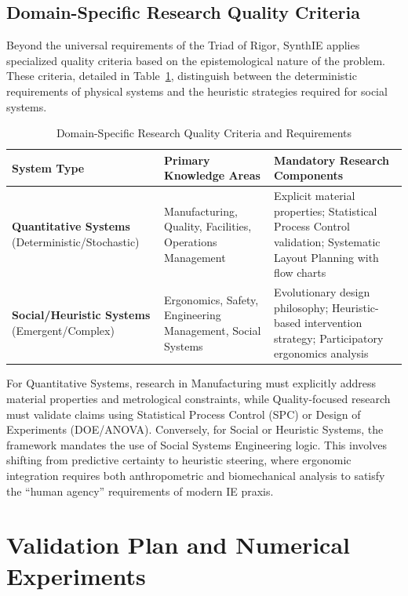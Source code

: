\documentclass[12pt,a4paper]{article}
\begin{document}
\subsection{Domain-Specific Research Quality Criteria}

Beyond the universal requirements of the Triad of Rigor, SynthIE applies specialized quality criteria based on the epistemological nature of the problem. These criteria, detailed in Table~\ref{tab:domain_criteria}, distinguish between the deterministic requirements of physical systems and the heuristic strategies required for social systems.

\begin{table}[h]
\centering
\caption{Domain-Specific Research Quality Criteria and Requirements}
\label{tab:domain_criteria}
\small
\begin{tabular}{@{}p{4cm}p{5cm}p{6cm}@{}}
\toprule
\textbf{System Type} & \textbf{Primary Knowledge Areas} & \textbf{Mandatory Research Components} \\ \midrule
\textbf{Quantitative Systems} (Deterministic/Stochastic) & Manufacturing, Quality, Facilities, Operations Management & Explicit material properties; Statistical Process Control validation; Systematic Layout Planning with flow charts \\ \addlinespace
\textbf{Social/Heuristic Systems} (Emergent/Complex) & Ergonomics, Safety, Engineering Management, Social Systems & Evolutionary design philosophy; Heuristic-based intervention strategy; Participatory ergonomics analysis \\ \bottomrule
\end{tabular}
\end{table}

For Quantitative Systems, research in Manufacturing must explicitly address material properties and metrological constraints, while Quality-focused research must validate claims using Statistical Process Control (SPC) or Design of Experiments (DOE/ANOVA). Conversely, for Social or Heuristic Systems, the framework mandates the use of Social Systems Engineering logic. This involves shifting from predictive certainty to heuristic steering, where ergonomic integration requires both anthropometric and biomechanical analysis to satisfy the ``human agency'' requirements of modern IE praxis.

\section{Validation Plan and Numerical Experiments}
\end{document}
